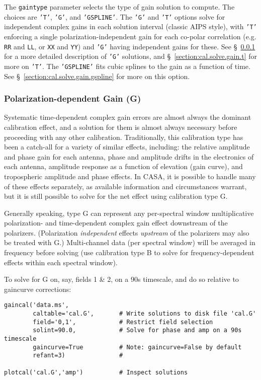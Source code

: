 The {\tt gaintype} parameter selects the type of gain solution to
compute.  The choices are {\tt 'T'}, {\tt 'G'}, and {\tt 'GSPLINE'}.
The {\tt 'G'} and {\tt 'T'} options solve for independent complex
gains in each solution interval (classic AIPS style), with {\tt 'T'} 
enforcing a single polarization-independent gain for each co-polar
correlation (e.g. {\tt RR} and {\tt LL}, or {\tt XX} and {\tt YY})
and {\tt 'G'} having independent gains for these.  
See \S~\ref{section:cal.solve.gain.g} for a more detailed description
of {\tt 'G'} solutions, and \S~\ref{section:cal.solve.gain.t} for more
on {\tt 'T'}.  The {\tt 'GSPLINE'} fits cubic splines to the gain as
a function of time.  See \S~\ref{section:cal.solve.gain.gspline} for
more on this option.

\subsubsection{Polarization-dependent Gain (G)}
\label{section:cal.solve.gain.g}

Systematic time-dependent complex gain errors are almost always the
dominant calibration effect, and a solution for them is almost always
necessary before proceeding with any other calibration.
Traditionally, this calibration type has been a catch-all for a
variety of similar effects, including: the relative amplitude and
phase gain for each antenna, phase and amplitude drifts in the
electronics of each antenna, amplitude response as a function of
elevation (gain curve), and tropospheric amplitude and phase effects.
In CASA, it is possible to handle many of these effects separately, as
available information and circumstances warrant, but it is still
possible to solve for the net effect using calibration type G.

Generally speaking, type G can represent any per-spectral window
multiplicative polarization- and time-dependent complex gain effect
downstream of the polarizers.  (Polarization {\it independent} effects
{\it upstream} of the polarizers may also be treated with G.)
Multi-channel data (per spectral window) will be averaged in frequency
before solving (use calibration type B to solve for
frequency-dependent effects within each spectral window).

To solve for G on, say, fields 1 \& 2, on a 90s timescale, and do so
relative to gaincurve corrections:
\small
\begin{verbatim}
gaincal('data.ms',
        caltable='cal.G',       # Write solutions to disk file 'cal.G'
        field='0,1',            # Restrict field selection
        solint=90.0,            # Solve for phase and amp on a 90s timescale
        gaincurve=True          # Note: gaincurve=False by default
        refant=3)               #
			        
plotcal('cal.G','amp')          # Inspect solutions
\end{verbatim}
\normalsize

